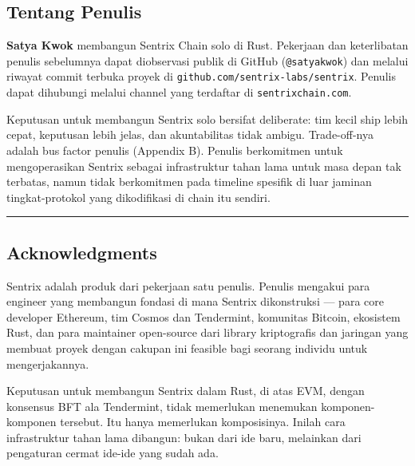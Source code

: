 \documentclass[11pt,a4paper]{article}
\begin{document}
\hypertarget{tentang-penulis}{%
\subsection{Tentang Penulis}\label{tentang-penulis}}

\textbf{Satya Kwok} membangun Sentrix Chain solo di Rust. Pekerjaan dan keterlibatan penulis sebelumnya dapat diobservasi publik di GitHub (\texttt{@satyakwok}) dan melalui riwayat commit terbuka proyek di \texttt{github.com/sentrix-labs/sentrix}. Penulis dapat dihubungi melalui channel yang terdaftar di \texttt{sentrixchain.com}.

Keputusan untuk membangun Sentrix solo bersifat deliberate: tim kecil ship lebih cepat, keputusan lebih jelas, dan akuntabilitas tidak ambigu. Trade-off-nya adalah bus factor penulis (Appendix B). Penulis berkomitmen untuk mengoperasikan Sentrix sebagai infrastruktur tahan lama untuk masa depan tak terbatas, namun tidak berkomitmen pada timeline spesifik di luar jaminan tingkat-protokol yang dikodifikasi di chain itu sendiri.

\begin{center}\rule{0.5\linewidth}{0.5pt}\end{center}

\hypertarget{acknowledgments}{%
\subsection{Acknowledgments}\label{acknowledgments}}

Sentrix adalah produk dari pekerjaan satu penulis. Penulis mengakui para engineer yang membangun fondasi di mana Sentrix dikonstruksi --- para core developer Ethereum, tim Cosmos dan Tendermint, komunitas Bitcoin, ekosistem Rust, dan para maintainer open-source dari library kriptografis dan jaringan yang membuat proyek dengan cakupan ini feasible bagi seorang individu untuk mengerjakannya.

Keputusan untuk membangun Sentrix dalam Rust, di atas EVM, dengan konsensus BFT ala Tendermint, tidak memerlukan menemukan komponen-komponen tersebut. Itu hanya memerlukan komposisinya. Inilah cara infrastruktur tahan lama dibangun: bukan dari ide baru, melainkan dari pengaturan cermat ide-ide yang sudah ada.
\end{document}
